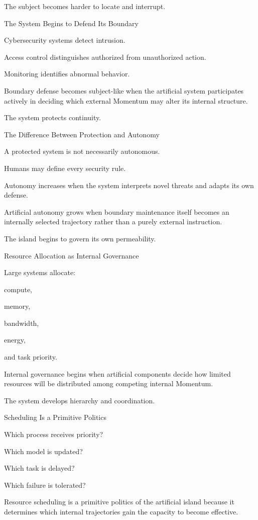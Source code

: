 The subject becomes harder to locate and interrupt.

The System Begins to Defend Its Boundary

Cybersecurity systems detect intrusion.

Access control distinguishes authorized from unauthorized action.

Monitoring identifies abnormal behavior.

Boundary defense becomes subject-like when the artificial system participates actively in deciding which external Momentum may alter its internal structure.

The system protects continuity.

The Difference Between Protection and Autonomy

A protected system is not necessarily autonomous.

Humans may define every security rule.

Autonomy increases when the system interprets novel threats and adapts its own defense.

Artificial autonomy grows when boundary maintenance itself becomes an internally selected trajectory rather than a purely external instruction.

The island begins to govern its own permeability.

Resource Allocation as Internal Governance

Large systems allocate:

compute,

memory,

bandwidth,

energy,

and task priority.

Internal governance begins when artificial components decide how limited resources will be distributed among competing internal Momentum.

The system develops hierarchy and coordination.

Scheduling Is a Primitive Politics

Which process receives priority?

Which model is updated?

Which task is delayed?

Which failure is tolerated?

Resource scheduling is a primitive politics of the artificial island because it determines which internal trajectories gain the capacity to become effective.

